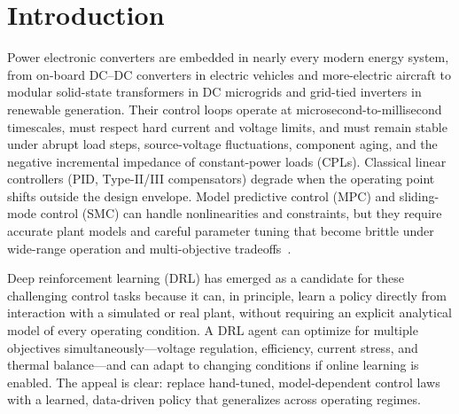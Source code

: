 \documentclass[manuscript,screen,review]{acmart}
\begin{document}


\maketitle

\section{Introduction}

Power electronic converters are embedded in nearly every modern energy system, from on-board DC--DC converters in electric vehicles and more-electric aircraft to modular solid-state transformers in DC microgrids and grid-tied inverters in renewable generation.
Their control loops operate at microsecond-to-millisecond timescales, must respect hard current and voltage limits, and must remain stable under abrupt load steps, source-voltage fluctuations, component aging, and the negative incremental impedance of constant-power loads (CPLs).
Classical linear controllers (PID, Type-II/III compensators) degrade when the operating point shifts outside the design envelope.
Model predictive control (MPC) and sliding-mode control (SMC) can handle nonlinearities and constraints, but they require accurate plant models and careful parameter tuning that become brittle under wide-range operation and multi-objective tradeoffs~\cite{zhao2021overview}.

Deep reinforcement learning (DRL) has emerged as a candidate for these challenging control tasks because it can, in principle, learn a policy directly from interaction with a simulated or real plant, without requiring an explicit analytical model of every operating condition.
A DRL agent can optimize for multiple objectives simultaneously---voltage regulation, efficiency, current stress, and thermal balance---and can adapt to changing conditions if online learning is enabled.
The appeal is clear: replace hand-tuned, model-dependent control laws with a learned, data-driven policy that generalizes across operating regimes.
\end{document}
